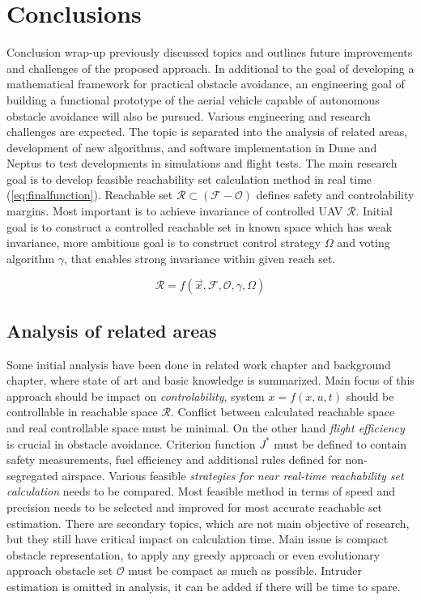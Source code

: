\chapter{Conclusions}

Conclusion wrap-up previously discussed topics and outlines future improvements and challenges of the proposed approach. In additional to the goal of developing a mathematical framework for practical obstacle avoidance, an engineering goal of building a functional prototype of the aerial vehicle capable of autonomous obstacle avoidance will also be pursued.  Various engineering and research challenges are expected. The topic is separated into the analysis of related areas, development of new algorithms, and software implementation in Dune and Neptus to test developments in simulations and flight tests. The main research goal is to develop feasible reachability  set calculation method in real time (\ref{eq:finalfunction}). Reachable set $\mathscr{R}\subset(\mathscr{F}-\mathscr{O})$ defines safety and controlability  margins. Most important is to achieve invariance of controlled UAV $\mathscr{R}$. Initial goal is to construct a controlled reachable set in known space which has weak invariance, more ambitious goal is to construct control strategy $\Omega$ and voting algorithm $\gamma$, that enables strong invariance within given reach set.

\begin{equation}\label{eq:finalfunction}
    \mathscr{R}=f(\vec{x},\mathscr{F},\mathscr{O},\gamma,\Omega)
\end{equation}

\section{Analysis of related areas}
Some initial analysis have been done in related work chapter and background chapter, where state of art and basic knowledge is summarized. Main focus of this approach should be impact on \textit{controlability}, system $\dot{x}=f(x,u,t)$ should be controllable in reachable space $\mathscr{R}$. Conflict between calculated reachable space and real controllable space must be minimal. On the other hand \textit{flight efficiency} is crucial in obstacle avoidance. Criterion function $J^*$ must be defined to contain safety measurements, fuel efficiency and additional rules defined for non-segregated airspace. Various feasible \textit{strategies for near real-time reachability set calculation} needs to be compared. Most feasible method in terms of speed and precision needs to be selected and improved for most accurate reachable set estimation. There are secondary topics, which are not main objective of research, but they still have critical impact on calculation time. Main issue is compact obstacle representation, to apply any greedy approach or even evolutionary approach obstacle set $\mathscr{O}$ must be compact as much as possible. Intruder estimation is omitted in analysis, it can be added if there will be time to spare.

